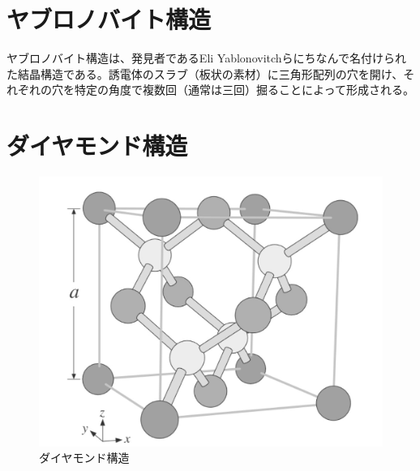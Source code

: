 \documentclass[platex,dvipdfmx,draft]{jsreport}
\numberwithin{equation}{section}
\begin{document}
\section{ヤブロノバイト構造}
ヤブロノバイト構造は、発見者であるEli Yablonovitchらにちなんで名付けられた結晶構造である。誘電体のスラブ（板状の素材）に三角形配列の穴を開け、それぞれの穴を特定の角度で複数回（通常は三回）掘ることによって形成される。


\section{ダイヤモンド構造}

\begin{figure}[htbp]
  \centering
  \includegraphics[width=0.5\linewidth]{diamond.png}
  \caption{ダイヤモンド構造}
  \label{fig:diamond}
\end{figure}
\end{document}
